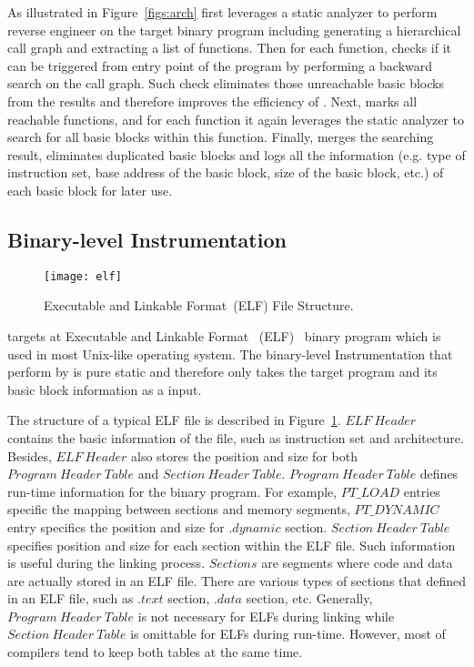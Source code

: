 As illustrated in Figure~\ref{figs:arch} \sysname first leverages a static analyzer to perform reverse engineer on the target binary program including generating a hierarchical call graph and extracting a list of functions. Then for each function, \sysname checks if it can be triggered from entry point of the program by performing a backward search on the call graph. Such check eliminates those unreachable basic blocks from the results and therefore improves the efficiency of \sysname. Next, \sysname marks all reachable functions, and for each function it again leverages the static analyzer to search for all basic blocks within this function. Finally, \sysname merges the searching result, eliminates duplicated basic blocks and logs all the information (e.g. type of instruction set, base address of the basic block, size of the basic block, etc.) of each basic block for later use.

\subsection{Binary-level Instrumentation}\label{sec:design:inst}


\begin{figure}[htbp]
\centering 
\texttt{[image: elf]}
\caption{Executable and Linkable Format~(ELF) File Structure.}
\label{figs:elf}
\end{figure}


\sysname targets at Executable and Linkable Format ~(ELF)~\cite{elf} binary program which is used in most Unix-like operating system. The binary-level Instrumentation that perform by \sysname is pure static and therefore only takes the target program and its basic block information as a input. 

The structure of a typical ELF file is described in Figure~\ref{figs:elf}. $ELF\ Header$ contains the basic information of the file, such as instruction set and architecture. Besides, $ELF\ Header$ also stores the position and size for both $Program\ Header\ Table$ and $Section\ Header\ Table$. $Program\ Header\ Table$ defines run-time information for the binary program. For example, $PT\_LOAD$ entries specific the mapping between sections and memory segments, $PT\_DYNAMIC$ entry specifics the position and size for $.dynamic$ section. $Section\ Header\ Table$ specifies position and size for each section within the ELF file. Such information is useful during the linking process. $Sections$ are segments where code and data are actually stored in an ELF file. There are various types of sections that defined in an ELF file, such as $.text$ section, $.data$ section, etc. Generally, $Program\ Header\ Table$ is not necessary for ELFs during linking while $Section\ Header\ Table$ is omittable for ELFs during run-time. However, most of compilers tend to keep both tables at the same time.

